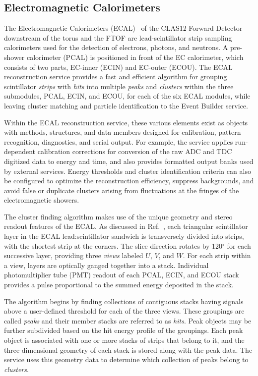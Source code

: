 \subsection{Electromagnetic Calorimeters}

The Electromagnetic Calorimeters (ECAL)~\cite{ecal-nim} of the CLAS12 Forward Detector downstream of the
torus and the FTOF are lead-scintillator strip sampling calorimeters used for the detection of electrons, photons,
and neutrons. A pre-shower calorimeter (PCAL) is positioned in front of the EC calorimeter, which consists of two
parts, EC-inner (ECIN) and EC-outer (ECOU). The ECAL reconstruction service provides a fast
and efficient algorithm for grouping scintillator {\it strips} with {\it hits} into multiple {\it peaks} and {\it clusters}
within the three submodules, PCAL, ECIN, and ECOU, for each of the six ECAL modules, while leaving cluster
matching and particle identification to the Event Builder service.

Within the ECAL reconstruction service, these various elements exist as objects with methods, structures, and data
members designed for calibration, pattern recognition, diagnostics, and serial output. For example, the service applies
run-dependent calibration corrections for conversion of the raw ADC and TDC digitized data to energy and time, and
also provides formatted output banks used by external services.  Energy thresholds and cluster identification criteria
can also be configured to optimize the reconstruction efficiency, suppress backgrounds, and avoid false or duplicate
clusters arising from fluctuations at the fringes of the electromagnetic showers.

The cluster finding algorithm makes use of the unique geometry and stereo readout features of the ECAL. As
discussed in Ref.~\cite{ecal-nim}, each triangular scintillator layer in the ECAL lead:scintillator sandwich is
transversely divided into strips, with the shortest strip at the corners. The slice direction rotates by 120$^\circ$
for each successive layer, providing three {\it views} labeled $U$, $V$, and $W$.  For each strip within a view,
layers are optically ganged together into a stack.  Individual photomultiplier tube (PMT) readout of each PCAL,
ECIN, and ECOU stack provides a pulse proportional to the summed energy deposited in the stack.

The algorithm begins by finding collections of contiguous {\color{red} stacks} having signals above a user-defined threshold for
each of the three views. These groupings are called {\it peaks} and their member {\color{red} stacks} are referred to as
{\it hits}.  Peak objects may be further subdivided based on the hit energy profile of the groupings. Each peak
object is associated with one or more stacks of strips that belong to it, and the three-dimensional geometry of each
stack is stored along with the peak data. The service uses this geometry data to determine which collection of
peaks belong to {\it clusters}.

